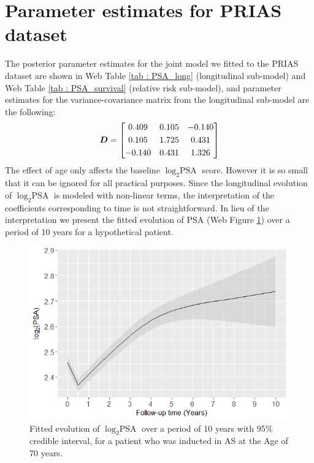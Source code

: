 
\section{Parameter estimates for PRIAS dataset}
\label{sec : param_estimates_jm_fit_prias}
The posterior parameter estimates for the joint model we fitted to the PRIAS dataset are shown in Web Table \ref{tab : PSA_long} (longitudinal sub-model) and Web Table \ref{tab : PSA_survival} (relative risk sub-model), and parameter estimates for the variance-covariance matrix from the longitudinal sub-model are the following:
\begin{equation*}
\boldsymbol{D} = \begin{bmatrix}
       0.409 & 0.105 & -0.140 \\[0.3em]
       0.105 & 1.725 & 0.431 \\[0.3em]
       -0.140 & 0.431 & 1.326
     \end{bmatrix}
\end{equation*} 
The effect of age only affects the baseline $\log_2 \mbox{PSA}$ score. However it is so small that it can be ignored for all practical purposes. Since the longitudinal evolution of $\log_2 \mbox{PSA}$ is modeled with non-linear terms, the interpretation of the coefficients corresponding to time is not straightforward. In lieu of the interpretation we present the fitted evolution of PSA (Web Figure \ref{fig : fitted_trend_psa}) over a period of 10 years for a hypothetical patient.

\begin{figure}[!htb]
\centerline{\includegraphics[width=\columnwidth]{images/fitted_trend_psa.png}}
\caption{Fitted evolution of $\log_2 \mbox{PSA}$ over a period of 10 years with 95\% credible interval, for a patient who was inducted in AS at the Age of 70 years.}
\label{fig : fitted_trend_psa}
\end{figure}

